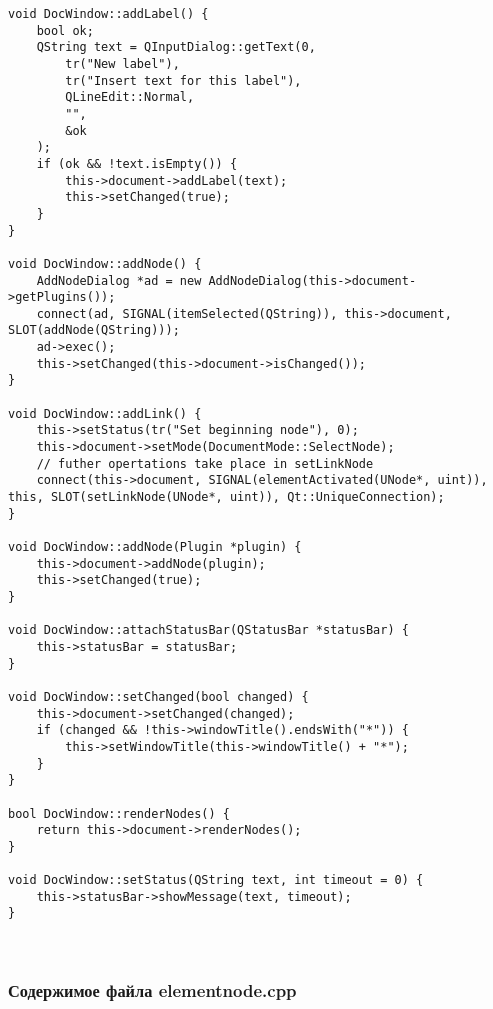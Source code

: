 \begin{lstlisting}
void DocWindow::addLabel() {
    bool ok;
    QString text = QInputDialog::getText(0,
        tr("New label"),
        tr("Insert text for this label"),
        QLineEdit::Normal,
        "",
        &ok
    );
    if (ok && !text.isEmpty()) {
        this->document->addLabel(text);
        this->setChanged(true);
    }
}

void DocWindow::addNode() {
    AddNodeDialog *ad = new AddNodeDialog(this->document->getPlugins());
    connect(ad, SIGNAL(itemSelected(QString)), this->document, SLOT(addNode(QString)));
    ad->exec();
    this->setChanged(this->document->isChanged());
}

void DocWindow::addLink() {
    this->setStatus(tr("Set beginning node"), 0);
    this->document->setMode(DocumentMode::SelectNode);
    // futher opertations take place in setLinkNode
    connect(this->document, SIGNAL(elementActivated(UNode*, uint)), this, SLOT(setLinkNode(UNode*, uint)), Qt::UniqueConnection);
}

void DocWindow::addNode(Plugin *plugin) {
    this->document->addNode(plugin);
    this->setChanged(true);
}

void DocWindow::attachStatusBar(QStatusBar *statusBar) {
    this->statusBar = statusBar;
}

void DocWindow::setChanged(bool changed) {
    this->document->setChanged(changed);
    if (changed && !this->windowTitle().endsWith("*")) {
        this->setWindowTitle(this->windowTitle() + "*");
    }
}

bool DocWindow::renderNodes() {
    return this->document->renderNodes();
}

void DocWindow::setStatus(QString text, int timeout = 0) {
    this->statusBar->showMessage(text, timeout);
}
\end{lstlisting}~\\

\subsubsection*{Содержимое файла elementnode.cpp}

